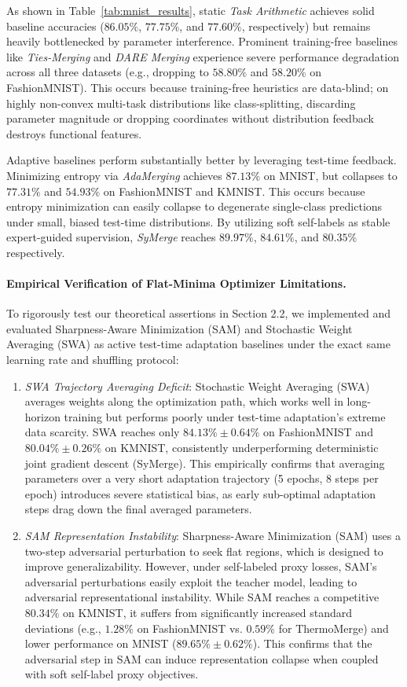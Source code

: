 As shown in Table~\ref{tab:mnist_results}, static \emph{Task Arithmetic} achieves solid baseline accuracies ($86.05\%$, $77.75\%$, and $77.60\%$, respectively) but remains heavily bottlenecked by parameter interference.
Prominent training-free baselines like \emph{Ties-Merging} and \emph{DARE Merging} experience severe performance degradation across all three datasets (e.g., dropping to $58.80\%$ and $58.20\%$ on FashionMNIST).
This occurs because training-free heuristics are data-blind; on highly non-convex multi-task distributions like class-splitting, discarding parameter magnitude or dropping coordinates without distribution feedback destroys functional features.

Adaptive baselines perform substantially better by leveraging test-time feedback.
Minimizing entropy via \emph{AdaMerging} achieves $87.13\%$ on MNIST, but collapses to $77.31\%$ and $54.93\%$ on FashionMNIST and KMNIST.
This occurs because entropy minimization can easily collapse to degenerate single-class predictions under small, biased test-time distributions.
By utilizing soft self-labels as stable expert-guided supervision, \emph{SyMerge} reaches $89.97\%$, $84.61\%$, and $80.35\%$ respectively.

\paragraph{Empirical Verification of Flat-Minima Optimizer Limitations.} To rigorously test our theoretical assertions in Section 2.2, we implemented and evaluated Sharpness-Aware Minimization (SAM) and Stochastic Weight Averaging (SWA) as active test-time adaptation baselines under the exact same learning rate and shuffling protocol:
\begin{enumerate}
\item \emph{SWA Trajectory Averaging Deficit}: Stochastic Weight Averaging (SWA) averages weights along the optimization path, which works well in long-horizon training but performs poorly under test-time adaptation's extreme data scarcity.
SWA reaches only $84.13\% \pm 0.64\%$ on FashionMNIST and $80.04\% \pm 0.26\%$ on KMNIST, consistently underperforming deterministic joint gradient descent (SyMerge).
This empirically confirms that averaging parameters over a very short adaptation trajectory (5 epochs, 8 steps per epoch) introduces severe statistical bias, as early sub-optimal adaptation steps drag down the final averaged parameters.
\item \emph{SAM Representation Instability}: Sharpness-Aware Minimization (SAM) uses a two-step adversarial perturbation to seek flat regions, which is designed to improve generalizability.
However, under self-labeled proxy losses, SAM's adversarial perturbations easily exploit the teacher model, leading to adversarial representational instability.
While SAM reaches a competitive $80.34\%$ on KMNIST, it suffers from significantly increased standard deviations (e.g., $1.28\%$ on FashionMNIST vs. $0.59\%$ for ThermoMerge) and lower performance on MNIST ($89.65\% \pm 0.62\%$).
This confirms that the adversarial step in SAM can induce representation collapse when coupled with soft self-label proxy objectives.
\end{enumerate}

